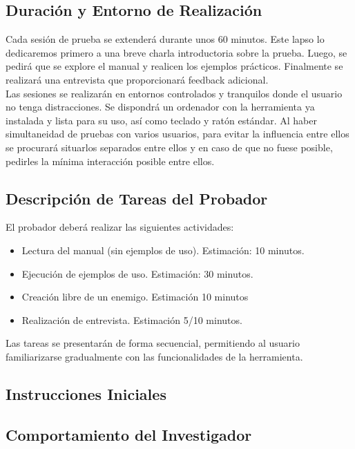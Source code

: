 \subsection{Duración y Entorno de Realización}
Cada sesión de prueba se extenderá durante unos 60 minutos. Este lapso lo dedicaremos primero a una breve charla introductoria sobre la prueba. Luego, se pedirá que se explore el manual y realicen los ejemplos prácticos. Finalmente se realizará una entrevista que proporcionará feedback adicional.\\

Las sesiones se realizarán en entornos controlados y tranquilos donde el usuario no tenga distracciones. Se dispondrá un ordenador con la herramienta ya instalada y lista para su uso, así como teclado y ratón estándar. Al haber simultaneidad de pruebas con varios usuarios, para evitar la influencia entre ellos se procurará situarlos separados entre ellos y en caso de que no fuese posible, pedirles la mínima interacción posible entre ellos.

\subsection{Descripción de Tareas del Probador}
El probador deberá realizar las siguientes actividades:

\begin{itemize}
\item Lectura del manual (sin ejemplos de uso). Estimación: 10 minutos.
\item Ejecución de ejemplos de uso. Estimación: 30 minutos.
\item Creación libre de un enemigo. Estimación 10 minutos
\item Realización de entrevista. Estimación 5/10 minutos.
\end{itemize}

Las tareas se presentarán de forma secuencial, permitiendo al usuario familiarizarse gradualmente con las funcionalidades de la herramienta. 

\subsection{Instrucciones Iniciales}

\subsection{Comportamiento del Investigador}

